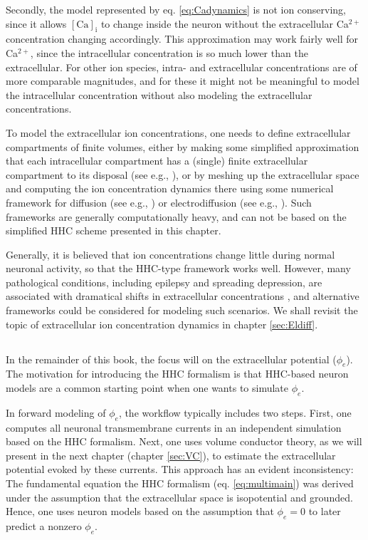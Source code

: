 Secondly, the model represented by eq. \ref{eq:Cadynamics} is not ion conserving, since it allows $\mathrm{[Ca]_i}$ to change inside the neuron without the extracellular Ca$^{2+}$ concentration changing accordingly. This approximation may work fairly well for Ca$^{2+}$, since the intracellular concentration is so much lower than the extracellular. For other ion species, intra- and extracellular concentrations are of more comparable magnitudes, and for these it might not be meaningful to model the intracellular concentration without also modeling the extracellular concentrations. 

To model the extracellular ion concentrations, one needs to define extracellular compartments of finite volumes, either by making some simplified approximation that each intracellular compartment has a (single) finite extracellular compartment to its disposal (see e.g., \cite{Kager2000, kneller2002, Cressman2009, WeiUllahSchiff2014, Saetra2020}), or by meshing up the extracellular space and computing the ion concentration dynamics there using some numerical framework for diffusion (see e.g., \cite{newton2018}) or electrodiffusion (see e.g., \cite{ellingsrud2020}). Such frameworks are generally computationally heavy, and can not be based on the simplified HHC scheme presented in this chapter. 

Generally, it is believed that ion concentrations change little during normal neuronal activity, so that the HHC-type framework works well. However, many pathological conditions, including epilepsy and spreading depression, are associated with dramatical shifts in extracellular concentrations \cite{Somjen2001, Zandt2015, Ayata2015}, and alternative frameworks could be considered for modeling such scenarios. We shall revisit the topic of extracellular ion concentration dynamics in chapter \ref{sec:Eldiff}.







\subsection{}
In the remainder of this book, the focus will on the extracellular potential ($\phi_e$). The motivation for introducing the HHC formalism is that HHC-based neuron models are a common starting point when one wants to simulate $\phi_e$. 

In forward modeling of $\phi_e$, the workflow typically includes two steps. First, one computes all neuronal transmembrane currents in an independent simulation based on the HHC formalism. Next, one uses volume conductor theory, as we will present in the next chapter (chapter \ref{sec:VC}), to estimate the extracellular potential evoked by these currents. This approach has an evident inconsistency: The fundamental equation the HHC formalism (eq. \ref{eq:multimain}) was derived under the assumption that the extracellular space is isopotential and grounded. Hence, one uses neuron models based on the assumption that $\phi_e = 0$ to later predict a nonzero $\phi_e$. 

